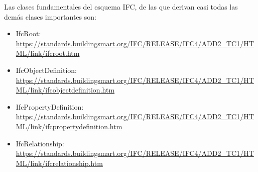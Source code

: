 \documentclass[spanish,10pt,a4paper,final,oneside]{article}
\begin{document}
Las clases fundamentales del esquema IFC, de las que derivan casi todas las demás clases importantes son:
\begin{itemize}
\item IfcRoot: \url{https://standards.buildingsmart.org/IFC/RELEASE/IFC4/ADD2_TC1/HTML/link/ifcroot.htm}
\item IfcObjectDefinition: \url{https://standards.buildingsmart.org/IFC/RELEASE/IFC4/ADD2_TC1/HTML/link/ifcobjectdefinition.htm}
\item IfcPropertyDefinition: \url{https://standards.buildingsmart.org/IFC/RELEASE/IFC4/ADD2_TC1/HTML/link/ifcpropertydefinition.htm}
\item IfcRelationship: \url{https://standards.buildingsmart.org/IFC/RELEASE/IFC4/ADD2_TC1/HTML/link/ifcrelationship.htm}
\end{itemize}
\end{document}
